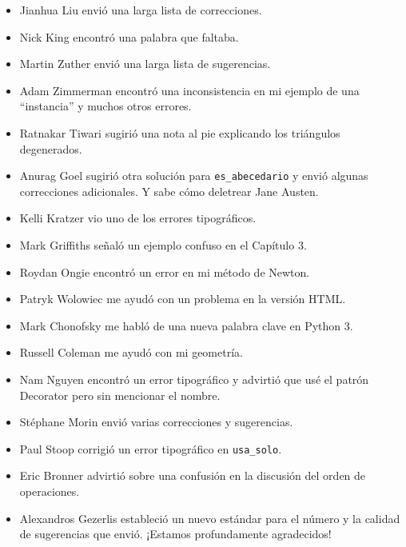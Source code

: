 \documentclass[10pt]{book}
\begin{document}
\begin{itemize}
\item Jianhua Liu envió una larga lista de correcciones.

\item Nick King encontró una palabra que faltaba.

\item Martin Zuther envió una larga lista de sugerencias.

\item Adam Zimmerman encontró una inconsistencia en mi ejemplo
de una ``instancia'' y muchos otros errores.

\item Ratnakar Tiwari sugirió una nota al pie explicando los triángulos
degenerados.

\item Anurag Goel sugirió otra solución para \verb"es_abecedario"
y envió algunas correcciones adicionales.  Y sabe cómo
deletrear Jane Austen.

\item Kelli Kratzer vio uno de los errores tipográficos.

\item Mark Griffiths señaló un ejemplo confuso en el Capítulo 3.

\item Roydan Ongie encontró un error en mi método de Newton.

\item Patryk Wolowiec me ayudó con un problema en la versión HTML.

\item Mark Chonofsky me habló de una nueva palabra clave en Python 3.

\item Russell Coleman me ayudó con mi geometría.

\item Nam Nguyen encontró un error tipográfico y advirtió que usé el patrón Decorator
pero sin mencionar el nombre.

\item St\'{e}phane Morin envió varias correcciones y sugerencias.

\item Paul Stoop corrigió un error tipográfico en \verb+usa_solo+.

\item Eric Bronner advirtió sobre una confusión en la discusión del
orden de operaciones.

\item Alexandros Gezerlis estableció un nuevo estándar para el número y
la calidad de sugerencias que envió.  ¡Estamos profundamente agradecidos!


\end{itemize}
\end{document}
